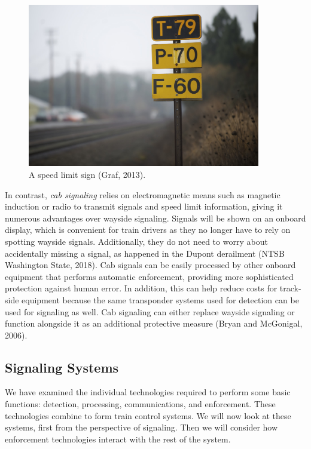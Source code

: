 \documentclass[11pt, titlepage]{article}
\begin{document}
\begin{figure}[ht]
    \begin{center}
        \includegraphics[width=4in]{SpeedLimits.png}
        \caption[Speed Limit Sign]{A speed limit sign (Graf, 2013).}
    \end{center}
\end{figure}

In contrast, \textit{cab signaling} relies on electromagnetic means such as
magnetic induction or radio to transmit signals and speed limit information, giving
it numerous advantages over wayside signaling. Signals will be shown on an onboard
display, which is convenient for train drivers as they no longer have to rely on
spotting wayside signals. Additionally, they do not need to worry about
accidentally missing a signal, as happened in the Dupont derailment (NTSB Washington State, 2018).
Cab signals can be easily processed by other onboard equipment that performs automatic
enforcement, providing more sophisticated protection against human error. In
addition, this can help reduce costs for track-side equipment because the same
transponder systems used for detection can be used for signaling as well. Cab
signaling can either replace wayside signaling or function alongside it as an
additional protective measure (Bryan and McGonigal, 2006).

\subsection{Signaling Systems}

We have examined the individual technologies required to perform some basic
functions: detection, processing, communications, and enforcement. These
technologies combine to form train control systems. We will now look at these
systems, first from the perspective of signaling. Then we will consider how
enforcement technologies interact with the rest of the system.
\end{document}
